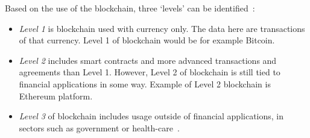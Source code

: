 Based on the use of the blockchain, three `levels' can be identified~\cite{Swan2015BlockchainEconomy}:
\begin{itemize}[noitemsep, nolistsep]
    \item \textit{Level 1} is blockchain used with currency only. The data here are transactions of that currency. Level 1 of blockchain would be for example Bitcoin.
    \item \textit{Level 2} includes smart contracts and more advanced transactions and agreements than Level 1. However, Level 2 of blockchain is still tied to financial applications in some way. Example of Level 2 blockchain is Ethereum platform.
    \item \textit{Level 3} of blockchain includes usage outside of financial applications, in sectors such as government or health-care~\cite{Swan2015BlockchainEconomy}.
\end{itemize}

